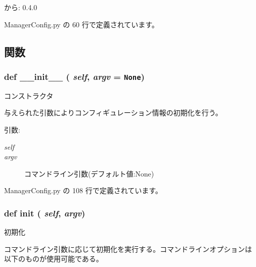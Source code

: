 \begin{Desc}
\item[から:]0.4.0 \end{Desc}


 ManagerConfig.py の 60 行で定義されています。

\subsection{関数}
\subsubsection{\setlength{\rightskip}{0pt plus 5cm}def \_\-\_\-init\_\-\_\- ( {\em self},  {\em argv} = {\tt None})}\label{classsource__py_1_1_manager_config_1_1_manager_config_c775ee34451fdfa742b318538164070e}


コンストラクタ 

与えられた引数によりコンフィギュレーション情報の初期化を行う。

\begin{Desc}
\item[引数:]
\begin{description}
\item[{\em self}]\item[{\em argv}]コマンドライン引数(デフォルト値:None) \end{description}
\end{Desc}


 ManagerConfig.py の 108 行で定義されています。
\subsubsection{\setlength{\rightskip}{0pt plus 5cm}def init ( {\em self},  {\em argv})}\label{classsource__py_1_1_manager_config_1_1_manager_config_c95cf511c1f2ff09ca47fe587657c2b4}


初期化 

コマンドライン引数に応じて初期化を実行する。コマンドラインオプションは 以下のものが使用可能である。

